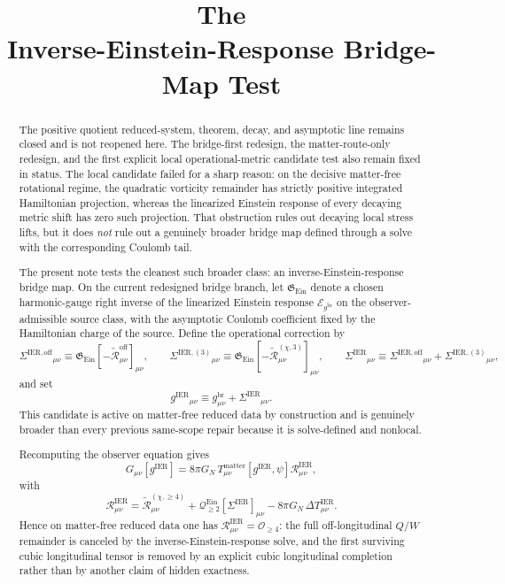 \documentclass[11pt]{article}
\title{\textbf{The \TheoryName{}}\\[0.4em]
\large Inverse-Einstein-Response Bridge-Map Test}
\author{}
\date{}
\newcommand{\ReBridge}{g^{\mathrm{br}}}
\newcommand{\OpMetricIER}{g^{\mathrm{IER}}}
\newcommand{\SigmaIER}{\Sigma^{\mathrm{IER}}}
\newcommand{\SigmaOff}{\Sigma^{\mathrm{IER,off}}}
\newcommand{\SigmaLongThree}{\Sigma^{\mathrm{IER},(3)}}
\newcommand{\ReOff}{\widetilde{\mathcal R}_{\mu\nu}^{\mathrm{off}}}
\newcommand{\ReLongThree}{\widetilde{\mathcal R}_{\mu\nu}^{(\chi,3)}}
\newcommand{\ReLongFour}{\widetilde{\mathcal R}_{\mu\nu}^{(\chi,\ge 4)}}
\newcommand{\DeltaTIER}{\Delta T_{\mu\nu}^{\mathrm{IER}}}
\newcommand{\EinLin}{\mathcal E_{\ReBridge}}
\newcommand{\EinQuad}{\mathcal Q_{\ge 2}^{\mathrm{Ein}}}
\newcommand{\EinInv}{\mathfrak G_{\mathrm{Ein}}}
\begin{document}
\maketitle

\begin{abstract}
The positive quotient reduced-system, theorem, decay, and asymptotic line remains closed and is not reopened here. The bridge-first redesign, the matter-route-only redesign, and the first explicit local operational-metric candidate test also remain fixed in status. The local candidate failed for a sharp reason: on the decisive matter-free rotational regime, the quadratic vorticity remainder has strictly positive integrated Hamiltonian projection, whereas the linearized Einstein response of every decaying metric shift has zero such projection. That obstruction rules out decaying local stress lifts, but it does \emph{not} rule out a genuinely broader bridge map defined through a solve with the corresponding Coulomb tail.

The present note tests the cleanest such broader class: an inverse-Einstein-response bridge map. On the current redesigned bridge branch, let \(\EinInv\) denote a chosen harmonic-gauge right inverse of the linearized Einstein response \(\EinLin\) on the observer-admissible source class, with the asymptotic Coulomb coefficient fixed by the Hamiltonian charge of the source. Define the operational correction by
\[
\SigmaOff{}_{\mu\nu}\equiv \EinInv[-\ReOff]_{\mu\nu},
\qquad
\SigmaLongThree{}_{\mu\nu}\equiv \EinInv[-\ReLongThree]_{\mu\nu},
\qquad
\SigmaIER{}_{\mu\nu}\equiv \SigmaOff{}_{\mu\nu}+\SigmaLongThree{}_{\mu\nu},
\]
and set
\[
\OpMetricIER{}_{\mu\nu}\equiv \ReBridge_{\mu\nu}+\SigmaIER{}_{\mu\nu}.
\]
This candidate is active on matter-free reduced data by construction and is genuinely broader than every previous same-scope repair because it is solve-defined and nonlocal.

Recomputing the observer equation gives
\[
G_{\mu\nu}[\OpMetricIER]
=
8\pi G_N\,T_{\mu\nu}^{\mathrm{matter}}[\OpMetricIER,\psi]
\mathcal R_{\mu\nu}^{\mathrm{IER}},
\]
with
\[
\mathcal R_{\mu\nu}^{\mathrm{IER}}
=
\ReLongFour
+\EinQuad[\SigmaIER]_{\mu\nu}
-8\pi G_N\,\DeltaTIER.
\]
Hence on matter-free reduced data one has \(\mathcal R_{\mu\nu}^{\mathrm{IER}}=\mathcal O_{\ge 4}\): the full off-longitudinal \(Q/W\) remainder is canceled by the inverse-Einstein-response solve, and the first surviving cubic longitudinal tensor is removed by an explicit cubic longitudinal completion rather than by another claim of hidden exactness.


\end{abstract}
\end{document}
